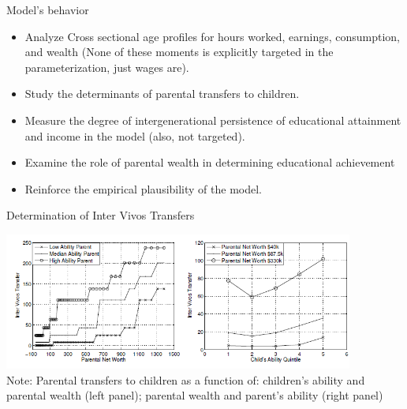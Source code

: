 \documentclass{beamer}
\begin{document}
\begin{frame}[label=Return7]{Model's behavior}

\begin{itemize}
\item Analyze Cross sectional age profiles for hours worked, earnings, consumption, and wealth (None of these moments is explicitly targeted in the parameterization, just wages are). \hyperlink{Life1}{} \hyperlink{Life2}{}
\item Study the determinants of parental transfers to children.
\item Measure the degree of intergenerational persistence of educational attainment and income in the model (also, not targeted). 
\item Examine the role of parental wealth in determining educational achievement
\item Reinforce the empirical plausibility of the model. \hyperlink{Extrapolate}{}
\end{itemize}
\end{frame}


\begin{frame}{Determination of Inter Vivos Transfers}
\begin{center}
\includegraphics[width=115mm]{Figure2.png}\\
\tiny{Note: Parental transfers to children as a function of: children's ability and parental wealth (left panel); parental wealth and parent's ability (right panel)}

\end{center}

\end{frame}
\end{document}
